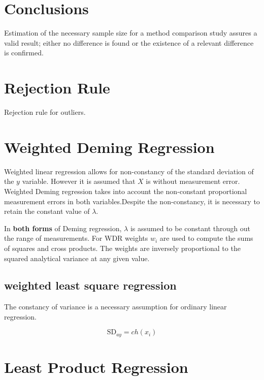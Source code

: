 \documentclass[12pt, a4paper]{report}
\theoremstyle{plain}
\theoremstyle{definition}
\theoremstyle{remark}
\begin{document}
\section{Conclusions} Estimation of the necessary sample size for a method comparison study assures a valid result; either no difference is found or the existence of a relevant difference is confirmed.



\section{Rejection Rule}
Rejection rule for outliers.



\section{Weighted Deming Regression}
Weighted linear regression allows for non-constancy of the standard deviation of the $y$ variable. However it is assumed that $X$ is without measurement error. Weighted Deming regression takes into account the non-constant proportional measurement errors in both variables.Despite the non-constancy, it is necessary to retain the constant value of $\lambda$.

In \textbf{both forms} of Deming regression, $\lambda$ is assumed to be constant through out the range of measurements. For WDR weights $w_{i}$ are used to compute the sums of squares and cross products. The weights are inversely proportional to the squared analytical variance at any given value.


\subsection{weighted least square regression}
The constancy of variance is a necessary assumption for ordinary
linear regression.

\begin{equation}
	\mbox{SD}_{ay}  = ch(x_{i})
\end{equation}



\section{Least Product Regression}
\end{document}
